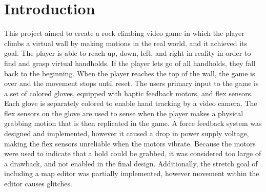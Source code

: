 \section{Introduction}
\label{sec:intro}

This project aimed to create a rock climbing video game in which the player
climbs a virtual wall by making motions in the real world, and it achieved its
goal. The player is able to reach up, down, left, and right in reality in order
to find and grasp virtual handholds. If the player lets go of all handholds,
they fall back to the beginning. When the player reaches the top of the wall,
the game is over and the movement stops until reset. The users primary input to
the game is a set of colored gloves, equipped with haptic feedback motors, and
flex sensors. Each glove is separately colored to enable hand tracking by a
video camera. The flex sensors on the glove are used to sense when the player
makes a physical grabbing motion that is then replicated in the game. A force
feedback system was designed and implemented, however it caused a drop in power
supply voltage, making the flex sensors unreliable when the motors vibrate.
Because the motors were used to indicate that a hold could be grabbed, it was
considered too large of a drawback, and not enabled in the final design.
Additionally, the stretch goal of including a map editor was partially
implemented, however movement within the editor causes glitches.
